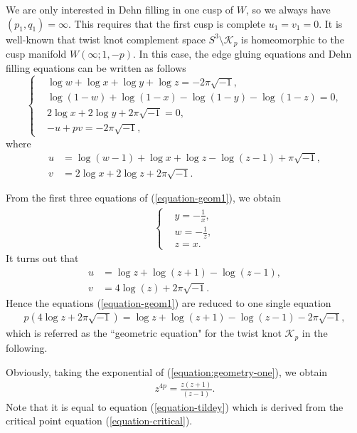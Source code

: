 \documentclass[12pt]{amsart}
\begin{document}
We are only interested in Dehn filling in one cusp of $W$, so we always have $(p_1,q_1)=\infty$. This requires that the first cusp is complete $u_1=v_1=0$. It is well-known that twist knot complement space $S^3\setminus \mathcal{K}_p$ is homeomorphic to the cusp manifold $W(\infty;1,-p)$.  In this case, the edge gluing equations and Dehn filling equations can be written as follows
\begin{equation} \label{equation-geom1} 
\left\{ \begin{aligned}
         &\log w+\log x+\log y+\log z =- 2\pi\sqrt{-1}, \\
          &        \log(1-w)+\log(1-x)-\log(1-y)-\log(1-z)=0,\\
          &2\log x +2\log y+2\pi\sqrt{-1}=0, \\
          &-u+pv=-2\pi\sqrt{-1},
                          \end{aligned} \right.
                          \end{equation}
where 
\begin{align}
    u&=\log (w-1)+\log x+\log z-\log(z-1)+\pi\sqrt{-1},\\\nonumber
    v&=2\log x +2\log z+2\pi\sqrt{-1}.
\end{align}



From the first three equations of (\ref{equation-geom1}), we obtain 
\begin{align}
\left\{\begin{aligned}
    &y=-\frac{1}{x}, \\
    &w=-\frac{1}{z}, \\
    &z=x.
    \end{aligned}\right.
\end{align}
It turns out that 
\begin{align} \label{equation-uv}
    u&=\log z+\log(z+1)-\log(z-1),\\\nonumber
v&=4\log \left(z\right)+2\pi \sqrt{-1}.
\end{align}
Hence the equations (\ref{equation-geom1}) are reduced to one single equation
\begin{align} \label{equation:geometry-one}
p(4\log z+2\pi\sqrt{-1})=\log z+\log (z+1)-\log(z-1)-2\pi\sqrt{-1},
\end{align}
which is referred as the ``geometric equation" for the twist knot $\mathcal{K}_p$ in the following.

Obviously, taking the exponential of (\ref{equation:geometry-one}), we obtain 
\begin{align} \label{equation-z4p}
   z^{4p}=\frac{z(z+1)}{(z-1)}.
\end{align}
Note that it is equal to equation (\ref{equation-tildey}) which is derived from the critical point equation (\ref{equation-critical}).
\end{document}
